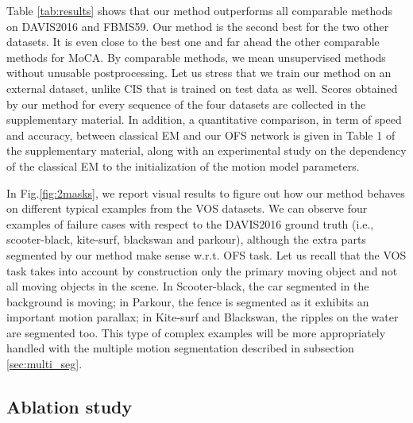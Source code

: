 \documentclass[10pt,twocolumn,letterpaper]{article}
\begin{document}
Table \ref{tab:results} shows that our method outperforms all comparable methods on DAVIS2016 and FBMS59. Our method is the second best for the two other datasets. It is even close to the best one and far ahead the other comparable methods for MoCA. By comparable methods, we mean unsupervised methods without unusable postprocessing. Let us stress that we train our method on an external dataset, unlike CIS that is trained on test data as well. Scores obtained by our method for every sequence of the four datasets are collected in the supplementary material. {\color{black} In addition, a quantitative comparison, in term of speed and accuracy, between classical EM and our OFS network is given in Table 1 of the supplementary material, along with an experimental study on the dependency of the classical EM to the initialization of the motion model parameters.}



In Fig.\ref{fig:2masks}, we report visual results to figure out how our method behaves on different typical examples from the VOS datasets. We can observe four examples of failure cases with respect to the DAVIS2016 ground truth (i.e., scooter-black, kite-surf, blackswan and parkour), although the extra parts segmented by our method make sense w.r.t. OFS task. Let us recall that the VOS task takes into account by construction only the primary moving object and not all moving objects in the scene. In Scooter-black, the car segmented in the background is moving; in Parkour, the fence is segmented as it exhibits an important motion parallax; in Kite-surf and Blackswan, the ripples on the water are segmented too. This type of complex examples will be more appropriately handled with the multiple motion segmentation described in subsection \ref{sec:multi_seg}.

\vspace{-0.1cm}
\subsection{Ablation study}
\label{ablation}
\end{document}

